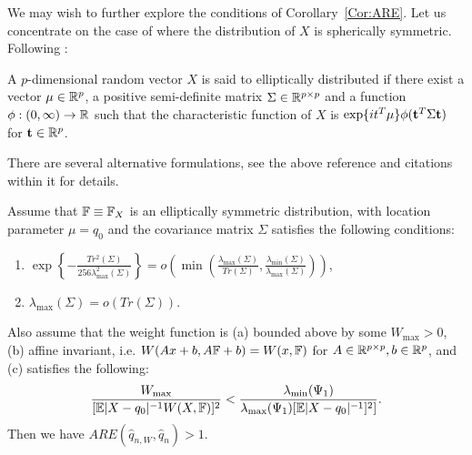 We may wish to further explore the conditions of Corollary~\ref{Cor:ARE}. 
Let us concentrate on the case of where the distribution of $X$ is spherically symmetric. Following \cite{ref:Fangetal90_Book}:

\begin{Definition}
A $p$-dimensional random vector $X$ is said to elliptically distributed if there exist a vector $\mu \in {\mathbb{R}}^p$, a positive semi-definite matrix $\Sigma \in {\mathbb{R}}^{p \times p}$ and a function 
$\phi: (0, \infty) \rightarrow {\mathbb{R}}$ such that the characteristic function of $X$ is $\exp \{ i t^{T} \mu \} \phi ({\bf{t}}^T \Sigma {\bf{t}})$ for ${\bf{t}} \in {\mathbb{R}}^p$.
\end{Definition}

There are several alternative formulations, see the above reference and citations within it for details.

\begin{Corollary}\label{Cor:Elliptic_ARE}
Assume that ${\mathbb{F}} \equiv {\mathbb{F}}_X$ is an elliptically symmetric distribution, with location parameter $\mu = q_{0}$ and the covariance matrix $\Sigma$ satisfies the following conditions:
%
\begin{enumerate}


\item $\exp \left\{ - \frac{Tr^2 (\Sigma)}{ 256 \lambda_{\max}^2 (\Sigma)} \right\} = 
o\left( \min\left( \frac{\lambda_{\max}(\Sigma) }{Tr( \Sigma)},
\frac{\lambda_{\min}(\Sigma)}{\lambda_{\max}(\Sigma)} \right) \right)$,

\item $\lambda_{\max}(\Sigma) = o( Tr(\Sigma))$.
\end{enumerate}

Also assume that the weight function is (a) bounded above by some $W_{\max} > 0$, (b) affine invariant, i.e. $ W (Ax + b, A{\mathbb{F}} + b) = W (x, {\mathbb{F}})$ for $A \in {\mathbb{R}}^{p \times p}, b \in {\mathbb{R}}^p$, and (c) satisfies the following:
%
\begin{equation}\label{eqn:CorElliptic_ARE_eqn}
\frac{W_{\max}}{[ \BE | X - q_0|^{-1} W(X, \BF)]^2 } <
\frac{\lambda_{\min} (\Psi_1)}{\lambda_{\max} (\Psi_1) [ \BE | X - q_0|^{-1}]^2]}.
\end{equation}
%
Then we have $ARE( \hat q_{n,W}, \hat q_n) > 1$.
\end{Corollary}


